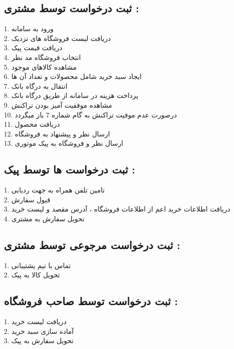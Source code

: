 \documentclass[12pt,onecolumn,a4paper]{article}
\begin{document}
\subsection{
ثبت درخواست توسط مشتری :
}
1.	ورود به سامانه\\
2.	دریافت لیست فروشگاه های نزدیک\\
3.	دریافت قیمت پیک\\
4.	انتخاب فروشگاه مد نظر\\
5.	مشاهده کالاهای موجود\\
6.	ایجاد سبد خرید شامل محصولات و تعداد آن ها\\
7.	انتقال به درگاه بانک\\
8.	پرداخت هزینه در سامانه از طریق درگاه بانک\\
9.	مشاهده موفقیت آمیز بودن تراکنش\\
10.	درصورت عدم موفیت تراکنش به گام شماره 7 باز میگردد \\
11.	دریافت محصول\\
12.	ارسال نظر و پیشنهاد به فروشگاه\\
13.	ارسال نظر و فروشگاه به پیک موتوری\\

\subsection{
ثبت درخواست ها توسط پیک :
}
1. تامین تلفن همراه به جهت ردیابی\\
2. قبول سفارش\\
3. دریافت اطلاعات خرید اعم از اطلاعات فروشگاه ، آدرس مقصد و لیست خرید \\
4. تحویل سفارش به مشتری\\

\subsection{
ثبت درخواست مرجوعی توسط مشتری :
}
1.	تماس با تیم پشتیبانی\\
2.	تحویل کالا به پیک\\

\subsection{
ثبت درخواست توسط صاحب فروشگاه :
}
1.	دریافت لیست خرید\\
2.	آماده سازی سبد خرید\\
3.	تحویل سفارش به پیک\\
\end{document}
